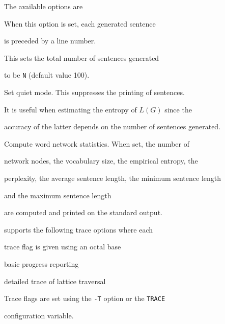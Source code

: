 The available options are





\begin{optlist}





   When this option is set, each generated sentence 


              is preceded by a line number.





    This sets the total number of sentences generated


              to be \texttt{N} (default value 100).





    Set quiet mode.  This suppresses the printing of sentences.


         It is useful when estimating the entropy of $L(G)$ since the


    accuracy of the latter depends on the number of sentences generated.





    Compute word network statistics.  When set, the number of


    network nodes, the vocabulary size, the empirical entropy, the


    perplexity, the average sentence length, the minimum sentence length


    and the maximum sentence length 


    are computed and printed on the standard output.


\end{optlist}












 supports the following trace options where each


trace flag is given using an octal base


\begin{optlist}


    basic progress reporting 


    detailed trace of lattice traversal


\end{optlist}


Trace flags are set using the \texttt{-T} option or the  \texttt{TRACE} 


configuration variable.


















